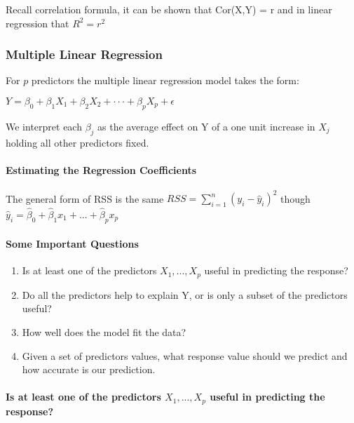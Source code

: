 \documentclass[
]{article}
\begin{document}
Recall correlation formula, it can be shown that Cor(X,Y) = r and in
linear regression that \(R^2 = r^2\)

\hypertarget{multiple-linear-regression}{%
\subsubsection{Multiple Linear
Regression}\label{multiple-linear-regression}}

For \(p\) predictors the multiple linear regression model takes the
form:

\(Y = \beta_0+\beta_1 X_1 + \beta_2 X_2 + \cdot\cdot\cdot + \beta_p X_p +\epsilon\)

We interpret each \(\beta_j\) as the average effect on Y of a one unit
increase in \(X_j\) holding all other predictors fixed.

\hypertarget{estimating-the-regression-coefficients}{%
\paragraph{Estimating the Regression
Coefficients}\label{estimating-the-regression-coefficients}}

The general form of RSS is the same
\(RSS = \sum_{i=1}^n(y_i-\hat y_i)^2\) though
\(\hat y_i = \hat\beta_0+\hat\beta_1 x_1 +...+\hat\beta_p x_p\)

\hypertarget{some-important-questions}{%
\paragraph{Some Important Questions}\label{some-important-questions}}

\begin{enumerate}
\def\labelenumi{\arabic{enumi}.}
\item
  Is at least one of the predictors \(X_1,...,X_p\) useful in predicting
  the response?
\item
  Do all the predictors help to explain Y, or is only a subset of the
  predictors useful?
\item
  How well does the model fit the data?
\item
  Given a set of predictors values, what response value should we
  predict and how accurate is our prediction.
\end{enumerate}

\hypertarget{is-at-least-one-of-the-predictors-x_1...x_p-useful-in-predicting-the-response}{%
\paragraph{\texorpdfstring{Is at least one of the predictors
\(X_1,...,X_p\) useful in predicting the
response?}{Is at least one of the predictors X\_1,...,X\_p useful in predicting the response?}}\label{is-at-least-one-of-the-predictors-x_1...x_p-useful-in-predicting-the-response}}
\end{document}
